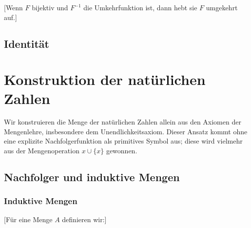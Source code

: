 \documentclass[main.tex]{subfiles}
\begin{document}
[Wenn \(F\) bijektiv und \(F^{-1}\) die Umkehrfunktion ist, dann hebt sie \(F\) umgekehrt auf.]


\section{Identität}


\chapter{Konstruktion der natürlichen Zahlen}

Wir konstruieren die Menge der natürlichen Zahlen allein aus den Axiomen der Mengenlehre, insbesondere dem Unendlichkeitsaxiom.  Dieser Ansatz kommt ohne eine explizite Nachfolgerfunktion als primitives Symbol aus; diese wird vielmehr aus der Mengenoperation \(x \cup \{x\}\) gewonnen.


\section{Nachfolger und induktive Mengen}

\subsection{Induktive Mengen}

[Für eine Menge \(A\) definieren wir:]

\begin{tabproof}
\end{tabproof}

\begin{tabproof}
\end{tabproof}
\end{document}
